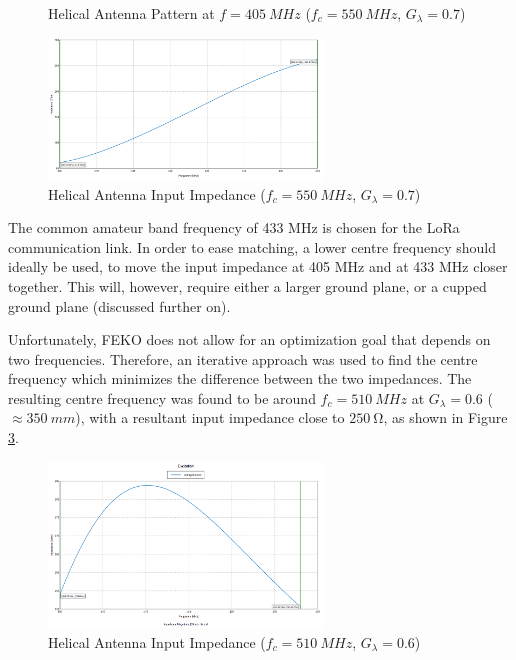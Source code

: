 \begin{figure}[!htb]
\begin{minipage}{.48\textwidth}
    \caption{Helical Antenna Pattern at $f = \SI{405}{MHz}$ ($f_c = \SI{550}{MHz}$, $G_\lambda = 0.7$)}
    \label{fig:helix3_pattern_405MHz}
  \end{minipage}
\end{figure}

\begin{figure}[!htb]
  \centering
  \includegraphics[width=0.65\textwidth]{helix3_impedance}
  \caption{Helical Antenna Input Impedance ($f_c = \SI{550}{MHz}$, $G_\lambda = 0.7$)}
  \label{fig:helix3_impedance}
\end{figure}

The common amateur band frequency of 433 MHz is chosen for the LoRa communication link. In order to ease matching, a lower centre frequency should ideally be used, to move the input impedance at 405 MHz and at 433 MHz closer together. This will, however, require either a larger ground plane, or a cupped ground plane (discussed further on).

Unfortunately, FEKO does not allow for an optimization goal that depends on two frequencies. Therefore, an iterative approach was used to find the centre frequency which minimizes the difference between the two impedances. The resulting centre frequency was found to be around $f_c = \SI{510}{MHz}$ at $G_\lambda = 0.6$ ($\approx \SI{350}{mm}$), with a resultant input impedance close to $\SI{250}{\ohm}$, as shown in Figure \ref{fig:helix4_impedance}.

\begin{figure}[!htb]
  \centering
  \includegraphics[width=0.65\textwidth]{helix4_impedance}
  \caption{Helical Antenna Input Impedance ($f_c = \SI{510}{MHz}$, $G_\lambda = 0.6$)}
  \label{fig:helix4_impedance}
\end{figure}

